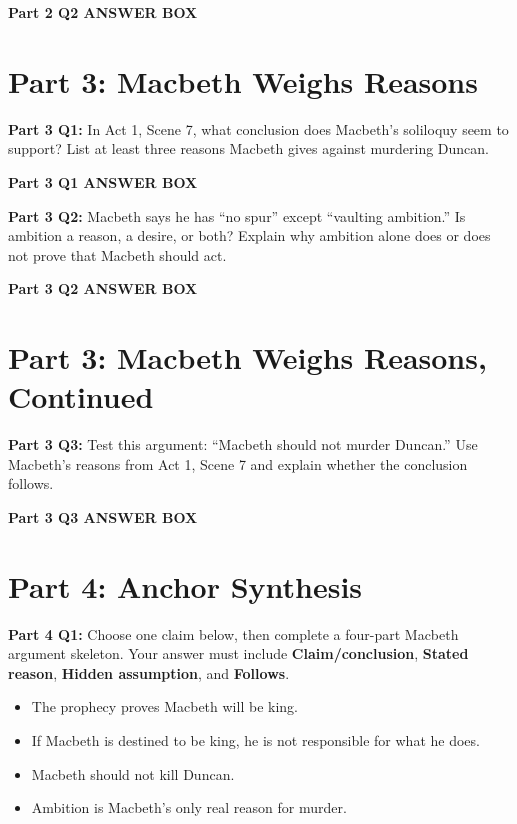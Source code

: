 \documentclass[12pt]{article}
\newcommand{\answerbox}[2]{%
\vspace{0.15em}
\noindent\textbf{#1}\par
\vspace{0.05em}
\noindent\fbox{%
\begin{minipage}[t][#2]{\dimexpr\textwidth-2\fboxsep-2\fboxrule}
\rule{\textwidth}{0pt}
\vspace{#2}
\end{minipage}
}\par
\vspace{0.25em}
}
\begin{document}
\answerbox{Part 2 Q2 ANSWER BOX}{2.25in}

\newpage

\section*{Part 3: Macbeth Weighs Reasons}

\textbf{Part 3 Q1:} In Act 1, Scene 7, what conclusion does Macbeth's soliloquy seem to support? List at least three reasons Macbeth gives against murdering Duncan.

\answerbox{Part 3 Q1 ANSWER BOX}{2.35in}

\textbf{Part 3 Q2:} Macbeth says he has ``no spur'' except ``vaulting ambition.'' Is ambition a reason, a desire, or both? Explain why ambition alone does or does not prove that Macbeth should act.

\answerbox{Part 3 Q2 ANSWER BOX}{2.0in}

\newpage

\section*{Part 3: Macbeth Weighs Reasons, Continued}

\textbf{Part 3 Q3:} Test this argument: ``Macbeth should not murder Duncan.'' Use Macbeth's reasons from Act 1, Scene 7 and explain whether the conclusion follows.

\answerbox{Part 3 Q3 ANSWER BOX}{2.2in}

\section*{Part 4: Anchor Synthesis}

\textbf{Part 4 Q1:} Choose one claim below, then complete a four-part Macbeth argument skeleton. Your answer must include \textbf{Claim/conclusion}, \textbf{Stated reason}, \textbf{Hidden assumption}, and \textbf{Follows}.\par
\vspace{0.1em}
\begin{itemize}[leftmargin=*, itemsep=0.08em, topsep=0.08em, parsep=0pt]
\item The prophecy proves Macbeth will be king.
\item If Macbeth is destined to be king, he is not responsible for what he does.
\item Macbeth should not kill Duncan.
\item Ambition is Macbeth's only real reason for murder.
\end{itemize}
\end{document}
